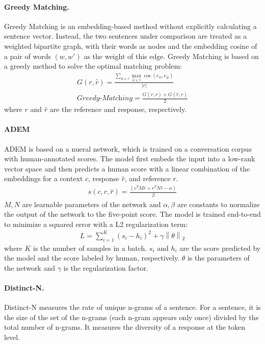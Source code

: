 \documentclass[runningheads]{llncs}
\begin{document}
    \paragraph{Greedy Matching.}
    Greedy Matching \cite{GreedyAndOptimal} is an embedding-based method without explicitly calculating a sentence vector. Instead, the two sentences under comparison are treated as a weighted bipartite graph, with their words as nodes and the embedding cosine of a pair of words $(w, w')$ as the weight of this edge. Greedy Matching is based on a greedy method to solve the optimal matching problem:
    \begin{align}
        G(r, \hat{r}) = \frac{
        \sum_{w \in r} \max_{\hat{w} \in \hat{r}} \cos(e_w, e_{\hat{w}})
        }{ |r| } \\
        \textit{Greedy-Matching} = \frac{
        G(r, \hat{r}) + G(\hat{r}, r)
        }{2}
    \end{align}
    where $r$ and $\hat{r}$ are the reference and response, respectively.

    \paragraph{ADEM}
    ADEM \cite{ADEM} is based on a nueral network, which is trained on a conversation corpus with human-annotated scores. The model first embeds the input into a low-rank vector space and then predicts a human score with a linear combination of the embeddings for a context $c$, response $\hat{r}$, and reference $r$.
    \begin{align}
        s(c, r, \hat{r}) = \frac{(c^T M \hat{r} + r^T N \hat{r} - \alpha)}{\beta}
    \end{align}
    $M, N$ are learnable parameters of the network and $\alpha, \beta$ are constants to normalize the output of the network to the five-point score. The model is trained end-to-end to minimize a squared error with a L2 regularization term:
    \begin{align}
        L = \sum_{i=1}^{K} (s_i - h_i)^2 + \gamma \left\| \theta \right\| _2
    \end{align}
    where $K$ is the number of samples in a batch. $s_i$ and $h_i$ are the score predicted by the model and the score labeled by human, respectively. $\theta$ is the parameters of the network and $\gamma$ is the regularization factor.

    \paragraph{Distinct-N.}
    Distinct-N \cite{MMI} measures the rate of unique n-grams of a sentence. For a sentence, it is the size of the set of the n-grams (each n-gram appears only once) divided by the total number of n-grams. It measures the diversity of a response at the token level.
\end{document}
